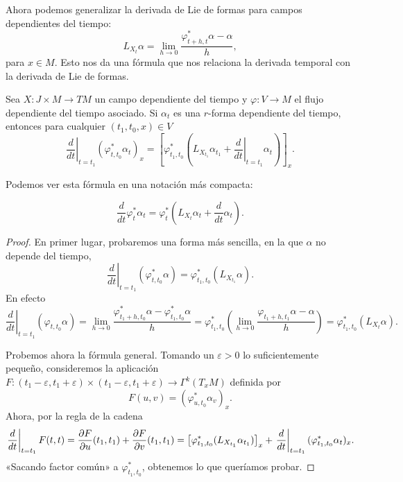   Ahora podemos generalizar la derivada de Lie de formas para campos dependientes del tiempo:
  \begin{equation*}
    L_{X_{t}}\alpha=\lim_{h\rightarrow 0}\frac{\varphi^*_{t+h,t} \alpha - \alpha}{h},
  \end{equation*}
  para $x\in M$.
  Esto nos da una fórmula que nos relaciona la derivada temporal con la derivada de Lie de formas.
  \begin{prop}
    Sea $ X:J\times M \rightarrow TM $ un campo dependiente del tiempo y $ \varphi:V\rightarrow M $ el flujo dependiente del tiempo asociado. Si $\alpha_t$ es una $r$-forma dependiente del tiempo, entonces para cualquier $(t_1,t_0,x)\in V$ 
   \begin{equation*}
     \left.\frac{d}{dt}\right\lvert _{t=t_1}\left(\varphi^*_{t,t_0} \alpha_t\right)_x = \left[\varphi^*_{t_1,t_0} \left( L_{X_{t_1}}\alpha_{t_1} + \left.\frac{d}{dt}\right\lvert_{t=t_1}\alpha_t\right) \right]_x.
   \end{equation*}
\end{prop}
   Podemos ver esta fórmula en una notación más compacta:

    \begin{equation*}
      \frac{d}{dt}\varphi^*_t \alpha_t = \varphi^*_t \left( L_{X_t}\alpha_t + \frac{d}{dt}\alpha_t \right).
    \end{equation*}

  \begin{proof}
    En primer lugar, probaremos una forma más sencilla, en la que $\alpha$ no depende del tiempo,
    \begin{equation*}
      \left.\frac{d}{dt}\right|_{t=t_1}(\varphi^*_{t,t_0}\alpha)=\varphi^*_{t_1,t_0}(L_{X_{t_1}}\alpha).
    \end{equation*}
    En efecto
    \begin{equation*}
      \left.\frac{d}{dt}\right|_{t=t_1}(\varphi_{t,t_0}\alpha)=\lim_{h\rightarrow 0}\frac{\varphi^*_{t_1+h,t_0}\alpha-\varphi^*_{t_1,t_0}\alpha}{h}=\varphi^*_{t_1,t_0}\left( \lim_{h\rightarrow 0 }\frac{\varphi_{t_1+h,t_1}\alpha-\alpha}{h} \right)=\varphi^*_{t_1,t_0}(L_{X_t}\alpha).
    \end{equation*}

    Probemos ahora la fórmula general. Tomando un $\varepsilon > 0$ lo suficientemente pequeño, consideremos la aplicación $F:(t_1-\varepsilon,t_1+\varepsilon)\times(t_1-\varepsilon,t_1+\varepsilon)\rightarrow\Gamma^k(T_xM)$ definida por
    \begin{equation*}
      F(u,v)=(\varphi^*_{u,t_0}\alpha_v)_x.
    \end{equation*}
    Ahora, por la regla de la cadena
    \begin{equation*}
      \left. \frac{d}{dt}\right|_{t=t_1}F(t,t)=\frac{\partial F}{\partial u}(t_1,t_1)+\frac{\partial F}{\partial v}(t_1,t_1)=\left[\varphi^*_{t_1,t_0}(L_{X_{t_1}}\alpha_{t_1})\right]_x+\left. \frac{d}{dt}\right|_{t=t_1}(\varphi^*_{t_1,t_0}\alpha_t)_x.
    \end{equation*}
    «Sacando factor común» a $\varphi^*_{t_1,t_0}$, obtenemos lo que queríamos probar.
  \end{proof}

